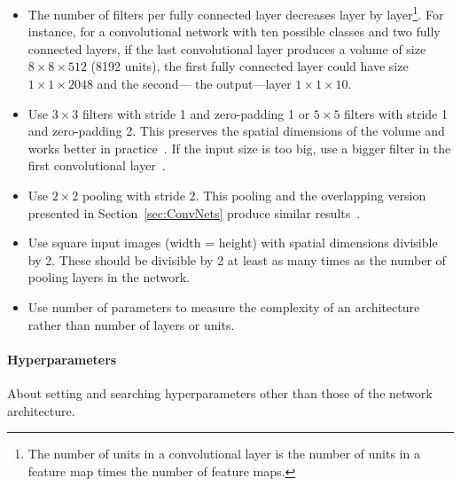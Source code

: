 \begin{itemize}
	\item The number of filters per fully connected layer decreases layer by layer\footnote{The number of units in a convolutional layer is the number of units in a feature map times the number of feature maps.}. For instance, for a convolutional network with ten possible classes and two fully connected layers, if the last convolutional layer produces a volume of size $8 \times 8 \times 512$ (8192 units), the first fully connected layer could have size $1 \times 1 \times 2048$ and the second--- the output---layer $1\times 1\times 10$.

	\item Use $3\times 3$ filters with stride 1 and zero-padding 1 or $5 \times 5$ filters with stride 1 and zero-padding 2. This preserves the spatial dimensions of the volume and works better in practice~\cite{Springenberg2014}. If the input size is too big, use a bigger filter in the first convolutional layer~\cite{Karpathy2016}.
	
	\item Use $2\times2$ pooling with stride 2. This pooling and the overlapping version presented in Section~\ref{sec:ConvNets} produce similar results~\cite{Krizhevsky2012}.
	\item Use square input images (width = height) with spatial dimensions divisible by 2. These should be divisible by 2 at least as many times as the number of pooling layers in the network.

	\item Use number of parameters to measure the complexity of an architecture rather than number of layers or units.
\end{itemize}



\paragraph{Hyperparameters} About setting and searching hyperparameters other than those of the network architecture.

